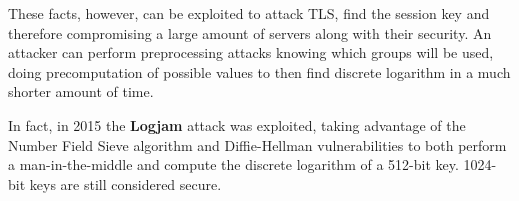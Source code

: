 These facts, however, can be exploited to attack TLS, find the session key and therefore compromising a large amount of servers along with their security. An attacker can perform preprocessing attacks knowing which groups will be used, doing precomputation of possible values to then find discrete logarithm in a much shorter amount of time.

In fact, in 2015 the \textbf{Logjam} attack was exploited, taking advantage of the Number Field Sieve algorithm and Diffie-Hellman vulnerabilities to both perform a man-in-the-middle and compute the discrete logarithm of a 512-bit key. 1024-bit keys are still considered secure.


